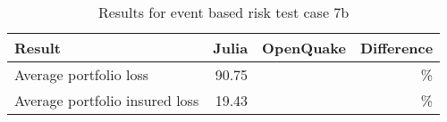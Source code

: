 \begin{table}[htbp]

\centering
\begin{tabular}{ l r r r }

\hline
\rowcolor{anti-flashwhite}
\bf{Result} & \bf{Julia} & \bf{OpenQuake} & \bf{Difference}\\
\hline
Average portfolio loss & 90.75 &  & \% \\
Average portfolio insured loss & 19.43 &  & \% \\
\hline
\end{tabular}

\caption{Results for event based risk test case 7b}
\label{tab:result-ebr-7b}
\end{table}